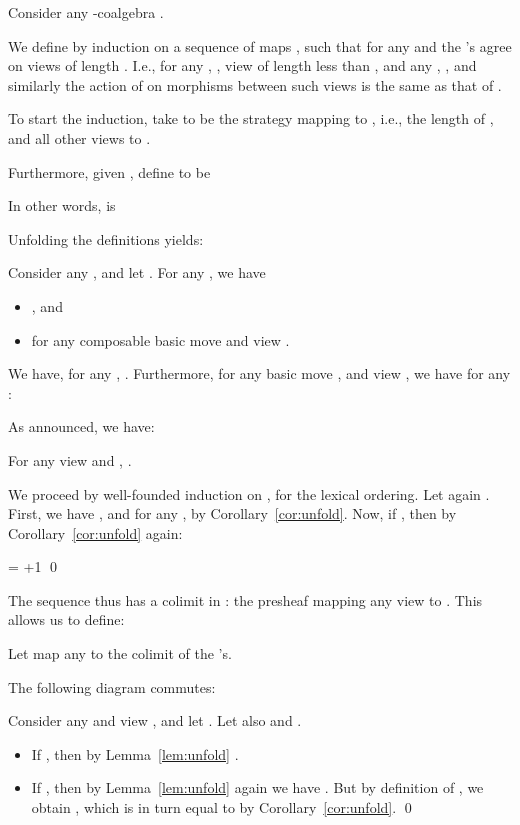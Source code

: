 \documentclass{LMCS}
\theoremstyle{plain}\newtheorem{satz}[thm]{Satz}
\begin{document}
Consider any -coalgebra .

We define by induction on  a sequence of maps , such that for any  and  the 's agree
on views of length . I.e., for any , ,
view  of length less than , and any , , and similarly the action of  on morphisms
between such views is the same as that of .

To start the induction, take  to be the strategy mapping
 to , i.e., the length of , and all other views to .

Furthermore, given , define  to be


In other words,  is 


Unfolding the definitions yields:
\begin{lem}\label{lem:unfold}
  Consider any , and let .  For
 any , we have
  \begin{itemize}
  \item  , and
  \item  for any composable basic move  and view .
  \end{itemize}
\end{lem}

\begin{cor}\label{cor:unfold}
  We have, for any , .  
  Furthermore, for any basic move , and view , we have for any :
  
\end{cor}

As announced, we have:
\begin{lem}\label{lem:station}
  For any view  and ,
  .
\end{lem}
\proof
  We proceed by well-founded induction on , for the
  lexical ordering. 
  Let again .
  First, we have , and for any ,
   by Corollary~\ref{cor:unfold}.
  Now, if , then by Corollary~\ref{cor:unfold} again:
  \begin{center}
     = +1 \qed
  \end{center}

  The sequence  thus has a colimit in :
  the presheaf mapping any view  to . This
  allows us to define:
\begin{defi}
  Let  map any  to the colimit of
  the 's.
\end{defi}

\begin{lem}
  The following diagram commutes:
  \begin{center}
  \end{center}
\end{lem}
\proof Consider any  and view , and let .  Let also  and
.
  \begin{itemize}
  \item If , then by Lemma~\ref{lem:unfold} .
  \item If , then by Lemma~\ref{lem:unfold} again we
    have . But by definition of
    , we obtain , which is in turn equal to  by
    Corollary~\ref{cor:unfold}. \qed
  \end{itemize}
\end{document}
